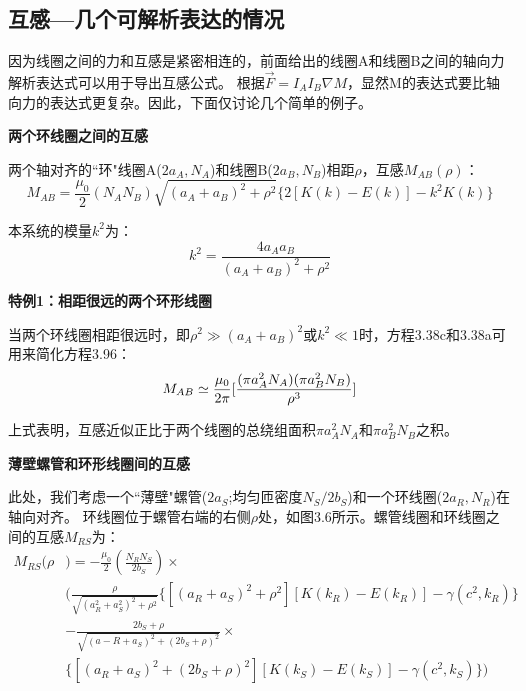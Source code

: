 \subsection{互感---几个可解析表达的情况}
因为线圈之间的力和互感是紧密相连的，前面给出的线圈A和线圈B之间的轴向力解析表达式可以用于导出互感公式。
根据$\vec{F}=I_A I_B \nabla M$，显然M的表达式要比轴向力的表达式更复杂。因此，下面仅讨论几个简单的例子。

\textbf{两个环线圈之间的互感} 

两个轴对齐的``环"线圈A($2a_A,N_A$)和线圈B($2a_B,N_B$)相距$\rho$，互感$M_{AB}(\rho)$：
  \begin{equation}
M_{AB}=\frac{\mu_0}{2}(N_AN_B)\sqrt{(a_A+a_B)^2+\rho^2}\{2[K(k)-E(k)]-k^2K(k)\}%
\end{equation}

本系统的模量$k^2$为：
\begin{equation*}
k^2=\frac{4a_Aa_B}{(a_A+a_B)^2+\rho^2}%
\end{equation*}

\textbf{特例1：相距很远的两个环形线圈} 

  当两个环线圈相距很远时，即$\rho^2\gg(a_A+a_B)^2$或$k^2\ll 1$时，方程3.38c和3.38a可用来简化方程3.96：
\begin{equation}
M_{AB}\simeq\frac{\mu_0}{2\pi}[\frac{(\pi a_A^2N_A)(\pi a_B^2N_B)}{\rho^3}]\\%
\end{equation}

上式表明，互感近似正比于两个线圈的总绕组面积$\pi a_A^2 N_A$和$\pi a_B^2 N_B$之积。

\textbf{薄壁螺管和环形线圈间的互感} 

  此处，我们考虑一个``薄壁"螺管($2a_S$;均匀匝密度$N_S/2b_S$)和一个环线圈($2a_R,N_R$)在轴向对齐。
  环线圈位于螺管右端的右侧$\rho$处，如图3.6所示。螺管线圈和环线圈之间的互感$M_{RS}$为：
  \begin{equation}
  \begin{split}
M_{RS}(\rho&)=-\frac{\mu_0}{2}(\frac{N_RN_S}{2b_S})\times\\
&(\frac{\rho}{\sqrt{(a_R^2+a_S^2)^2+\rho^2}}\{[(a_R+a_S)^2+\rho^2][K(k_R)-E(k_R)]-\gamma(c^2,k_R)\}\\
&-\frac{2b_S+\rho}{\sqrt{(a-R+a_S)^2+(2b_S+\rho)^2}}\times\\
&\{[(a_R+a_S)^2+(2b_S+\rho)^2][K(k_S)-E(k_S)]-\gamma(c^2,k_S)\})%
  \end{split}
\end{equation}

